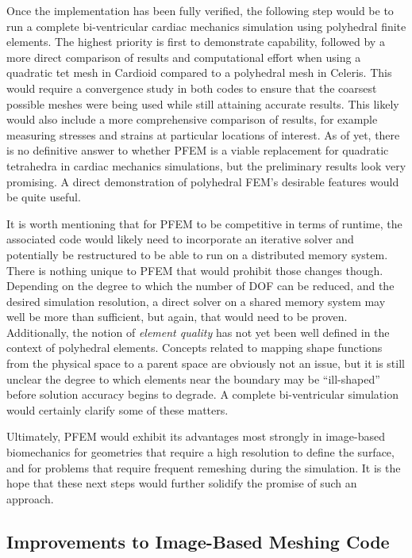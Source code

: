 Once the implementation has been fully verified, the following step would be to run a complete bi-ventricular cardiac mechanics simulation using polyhedral finite elements. The highest priority is first to demonstrate capability, followed by a more direct comparison of results and computational effort when using a quadratic tet mesh in Cardioid compared to a polyhedral mesh in Celeris. This would require a convergence study in both codes to ensure that the coarsest possible meshes were being used while still attaining accurate results. This likely would also include a more comprehensive comparison of results, for example measuring stresses and strains at particular locations of interest. As of yet, there is no definitive answer to whether PFEM is a viable replacement for quadratic tetrahedra in cardiac mechanics simulations, but the preliminary results look very promising. A direct demonstration of polyhedral FEM's desirable features would be quite useful.

It is worth mentioning that for PFEM to be competitive in terms of runtime, the associated code would likely need to incorporate an iterative solver and potentially be restructured to be able to run on a distributed memory system. There is nothing unique to PFEM that would prohibit those changes though. Depending on the degree to which the number of DOF can be reduced, and the desired simulation resolution, a direct solver on a shared memory system may well be more than sufficient, but again, that would need to be proven. Additionally, the notion of \textit{element quality} has not yet been well defined in the context of polyhedral elements. Concepts related to mapping shape functions from the physical space to a parent space are obviously not an issue, but it is still unclear the degree to which elements near the boundary may be ``ill-shaped'' before solution accuracy begins to degrade. A complete bi-ventricular simulation would certainly clarify some of these matters.

Ultimately, PFEM would exhibit its advantages most strongly in image-based biomechanics for geometries that require a high resolution to define the surface, and for problems that require frequent remeshing during the simulation. It is the hope that these next steps would further solidify the promise of such an approach.

\subsection{Improvements to Image-Based Meshing Code}
\label{Improvements to Image-Based Meshing Code}

